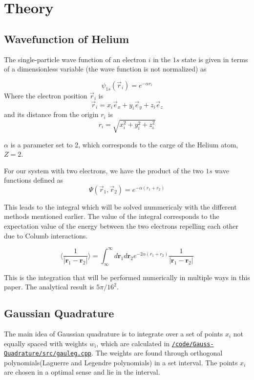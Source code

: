 \documentclass[../main.tex]{subfiles}
\begin{document}
\section{Theory} \label{sec:theory}
\subsection{Wavefunction of Helium} \label{sec:QMProb}
The single-particle wave function of an electron $i$ in the $1s$ state is given in terms of a dimensionless variable (the wave function is not normalized) as

\[\psi_{1s}(\vec{r}_i) = e^{-\alpha r_i}\]
Where the electron position $\vec{r}_i$ is
\[\vec{r}_i = x_i \vec{e}_x + y_i \vec{e}_y + z_i \vec{e}_z\]
and its distance from the origin $r_i$ is
\[r_i = \sqrt{x_i^2 + y_i^2 + z_i^2}\]

$\alpha$ is a parameter set to 2, which corresponds to the carge of the Helium atom, $Z = 2$.


For our system with two electrons, we have the product of the two $1s$ wave functions defined as
\[\Psi(\vec{r}_1, \vec{r}_2) = e^{-\alpha(r_1 + r_2)}\]

This leads to the integral which will be solved nummericaly with the  different methods mentioned earlier.
The value of the integral corresponds to the expectation value of the  energy between the two electrons repelling each other due to Columb interactions.

\begin{equation}
  \langle \frac{1}{|\mathbf{r}_1 - \mathbf{r}_2|} \rangle = \int_{\infty}^\infty d\mathbf{r}_1 d\mathbf{r}_2 e^{-2\alpha(r_1 + r_2)} \frac{1}{|\mathbf{r}_1 - \mathbf{r}_2|}
  \label{eq:int-to-solve}
\end{equation}
\vspace{1cm}

This is the integration that will be performed numerically in multiple ways in this paper. The analytical result is $5\pi/16^2$.

\subsection{Gaussian Quadrature} \label{sec:GQ}
The main idea of Gaussian quadrature is to integrate over a set of points $x_i$ not equally spaced with weights $w_i$, which are calculated in \href{https://github.com/kmaasrud/Project-3/blob/master/code/Gauss-Quadrature/src/gauleg.cpp}{\texttt{/code/Gauss-Quadrature/src/gauleg.cpp}}. The weights are found through orthogonal polynomials(Laguerre and Legendre polynomials) in a set interval. The points $x_i$ are chosen in a optimal sense and lie in the interval.
\end{document}
